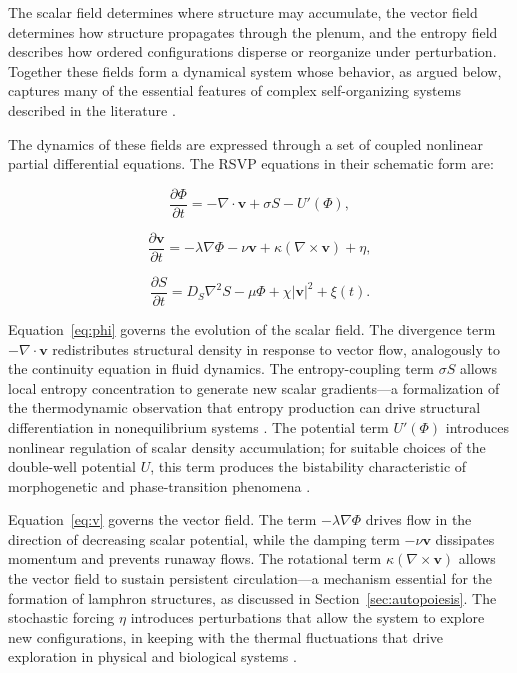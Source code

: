\documentclass[12pt]{article}
\begin{document}
The scalar field determines where structure may accumulate, the vector field determines how structure propagates through the plenum, and the entropy field describes how ordered configurations disperse or reorganize under perturbation. Together these fields form a dynamical system whose behavior, as argued below, captures many of the essential features of complex self-organizing systems described in the literature \cite{nicolis1977,haken1983,kauffman1993}.

The dynamics of these fields are expressed through a set of coupled nonlinear partial differential equations. The RSVP equations in their schematic form are:

\begin{equation}
\frac{\partial \Phi}{\partial t} = -\nabla \cdot \mathbf{v} + \sigma S - U'(\Phi),
\label{eq:phi}
\end{equation}

\begin{equation}
\frac{\partial \mathbf{v}}{\partial t} = -\lambda \nabla \Phi - \nu \mathbf{v} + \kappa (\nabla \times \mathbf{v}) + \eta,
\label{eq:v}
\end{equation}

\begin{equation}
\frac{\partial S}{\partial t} = D_S \nabla^2 S - \mu \Phi + \chi |\mathbf{v}|^2 + \xi(t).
\label{eq:S}
\end{equation}

Equation~\eqref{eq:phi} governs the evolution of the scalar field. The divergence term $-\nabla \cdot \mathbf{v}$ redistributes structural density in response to vector flow, analogously to the continuity equation in fluid dynamics. The entropy-coupling term $\sigma S$ allows local entropy concentration to generate new scalar gradients---a formalization of the thermodynamic observation that entropy production can drive structural differentiation in nonequilibrium systems \cite{prigogine1984}. The potential term $U'(\Phi)$ introduces nonlinear regulation of scalar density accumulation; for suitable choices of the double-well potential $U$, this term produces the bistability characteristic of morphogenetic and phase-transition phenomena \cite{nicolis1977,goldenfeld1992}.

Equation~\eqref{eq:v} governs the vector field. The term $-\lambda \nabla \Phi$ drives flow in the direction of decreasing scalar potential, while the damping term $-\nu \mathbf{v}$ dissipates momentum and prevents runaway flows. The rotational term $\kappa(\nabla \times \mathbf{v})$ allows the vector field to sustain persistent circulation---a mechanism essential for the formation of lamphron structures, as discussed in Section~\ref{sec:autopoiesis}. The stochastic forcing $\eta$ introduces perturbations that allow the system to explore new configurations, in keeping with the thermal fluctuations that drive exploration in physical and biological systems \cite{nicolis1977,bak1996}.
\end{document}
